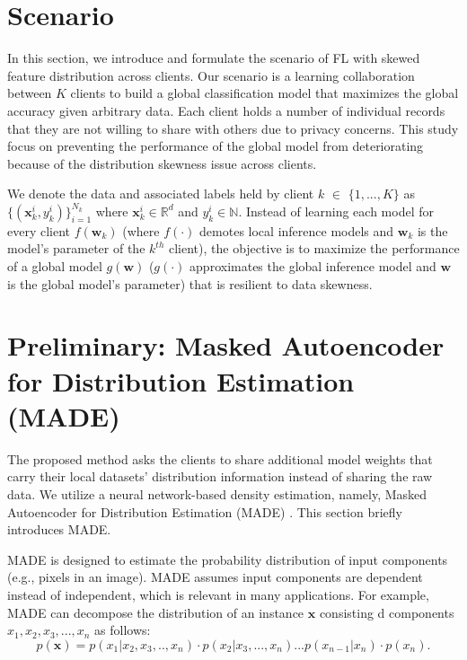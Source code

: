 \documentclass[mathfont=newtx]{uai2023} %
\begin{document}
\section{Scenario}
\label{sec:problem}
In this section, we introduce and formulate the scenario of FL with skewed feature distribution across clients. 
Our scenario is a learning collaboration between $K$ clients to build a global classification model that maximizes the global accuracy given arbitrary data. Each client holds a number of individual records that they are not willing to share with others due to privacy concerns. This study focus on preventing the performance of the global model from deteriorating because of the distribution skewness issue \cite{survey} across clients.

We denote the data and associated labels held by client $k$ $\in$ $\{1,...,K\}$ as $ \{( \mathbf{x}_k^i,y_k^i )\}_{i=1}^{N_k}$ where $ \mathbf{x}_k^i \in \mathbb{R}^d$ and $y_k^i \in \mathbb{N}$. Instead of learning each model for every client $f(\mathbf{w}_k)$ (where $f(\cdot)$ demotes local inference models and $\mathbf{w}_k$ is the model's parameter of the $k^{th}$ client), the objective is to maximize the performance of a global model $g(\mathbf{w})$ ($g(\cdot)$ approximates the global inference model and $\mathbf{w}$ is the global model's parameter) that is resilient to data skewness.  

\section{Preliminary: Masked Autoencoder for Distribution Estimation (MADE) }
\label{sec:made}
The proposed method asks the clients to share additional model weights that carry their local datasets' distribution information instead of sharing the raw data. We utilize a neural network-based density estimation, namely, Masked Autoencoder for Distribution Estimation (MADE) \cite{MADE}. This section briefly introduces MADE.

MADE is designed to estimate the probability distribution of input components (e.g., pixels in an image). MADE assumes input components are dependent instead of independent, which is relevant in many applications. For example, MADE can decompose the distribution of an instance $\textbf{x}$ consisting d components $x_1, x_2, x_3, ..., x_n$ as follows:
\begin{equation}
	\label{eq:MADE_decomposition}
   p(\mathbf{x}) =   p(x_1|x_2,x_3,..,x_n) \cdot p(x_2|x_3,...,x_n) 
					...p(x_{n-1}|x_n) \cdot p(x_n). 
\end{equation}
 
\end{document}
